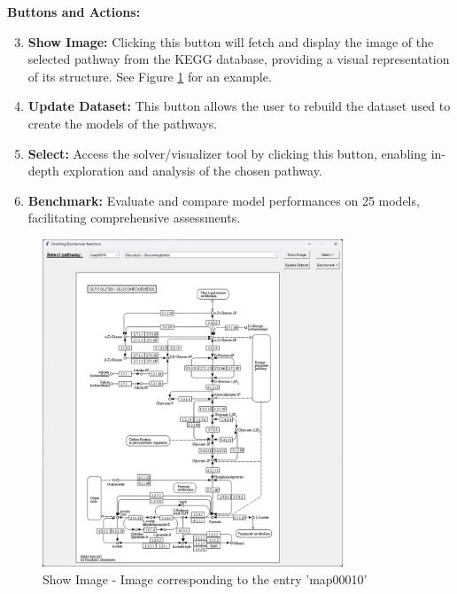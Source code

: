 \textbf{Buttons and Actions:}

\begin{enumerate} 
\setcounter{enumi}{2}   

    \item \textbf{Show Image:} Clicking this button will fetch and display the image of the selected pathway from the KEGG database, providing a visual representation of its structure. See Figure \ref{fig:show_image} for an example.

    \item \textbf{Update Dataset:} This button allows the user to rebuild the dataset used to create the models of the pathways.
    
    \item \textbf{Select:} Access the solver/visualizer tool by clicking this button, enabling in-depth exploration and analysis of the chosen pathway.
    
    \item \textbf{Benchmark:} Evaluate and compare model performances on 25 models, facilitating comprehensive assessments.
\end{enumerate}

\begin{figure}[H]
    \centering
    \includegraphics[width=0.8\textwidth]{Design of the User Interface/image_pathway.png}
    \caption{Show Image - Image corresponding to the entry 'map00010'}
    \label{fig:show_image}
\end{figure}

